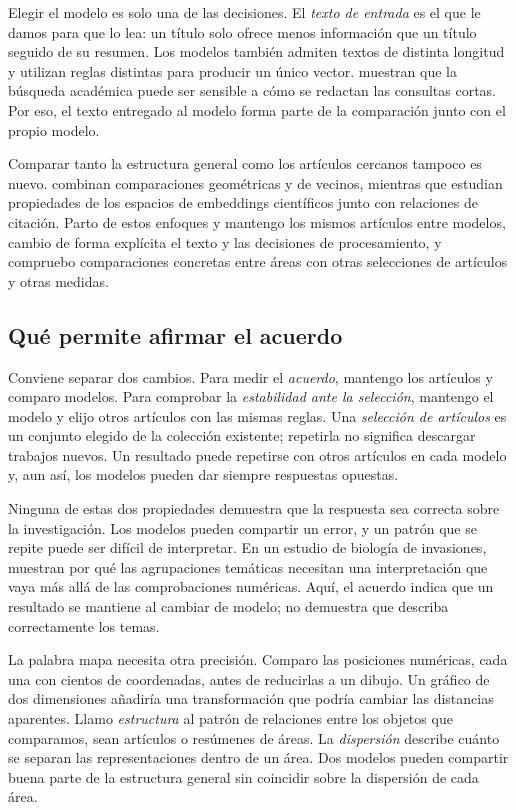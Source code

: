 \documentclass[12pt]{article}
\begin{document}
Elegir el modelo es solo una de las decisiones. El \emph{texto de entrada} es el que le damos para que lo lea: un título solo ofrece menos información que un título seguido de su resumen. Los modelos también admiten textos de distinta longitud y utilizan reglas distintas para producir un único vector. \citet{singh-singh-2022-inefficiency} muestran que la búsqueda académica puede ser sensible a cómo se redactan las consultas cortas. Por eso, el texto entregado al modelo forma parte de la comparación junto con el propio modelo.

Comparar tanto la estructura general como los artículos cercanos tampoco es nuevo. \citet{ref4e1e0d5582} combinan comparaciones geométricas y de vecinos, mientras que \citet{ref6da178065c} estudian propiedades de los espacios de embeddings científicos junto con relaciones de citación. Parto de estos enfoques y mantengo los mismos artículos entre modelos, cambio de forma explícita el texto y las decisiones de procesamiento, y compruebo comparaciones concretas entre áreas con otras selecciones de artículos y otras medidas.

\subsection{Qué permite afirmar el acuerdo}
Conviene separar dos cambios. Para medir el \emph{acuerdo}, mantengo los artículos y comparo modelos. Para comprobar la \emph{estabilidad ante la selección}, mantengo el modelo y elijo otros artículos con las mismas reglas. Una \emph{selección de artículos} es un conjunto elegido de la colección existente; repetirla no significa descargar trabajos nuevos. Un resultado puede repetirse con otros artículos en cada modelo y, aun así, los modelos pueden dar siempre respuestas opuestas.

Ninguna de estas dos propiedades demuestra que la respuesta sea correcta sobre la investigación. Los modelos pueden compartir un error, y un patrón que se repite puede ser difícil de interpretar. En un estudio de biología de invasiones, \citet{QSSreviewQ17} muestran por qué las agrupaciones temáticas necesitan una interpretación que vaya más allá de las comprobaciones numéricas. Aquí, el acuerdo indica que un resultado se mantiene al cambiar de modelo; no demuestra que describa correctamente los temas.

La palabra mapa necesita otra precisión. Comparo las posiciones numéricas, cada una con cientos de coordenadas, antes de reducirlas a un dibujo. Un gráfico de dos dimensiones añadiría una transformación que podría cambiar las distancias aparentes. Llamo \emph{estructura} al patrón de relaciones entre los objetos que comparamos, sean artículos o resúmenes de áreas. La \emph{dispersión} describe cuánto se separan las representaciones dentro de un área. Dos modelos pueden compartir buena parte de la estructura general sin coincidir sobre la dispersión de cada área.
\end{document}
